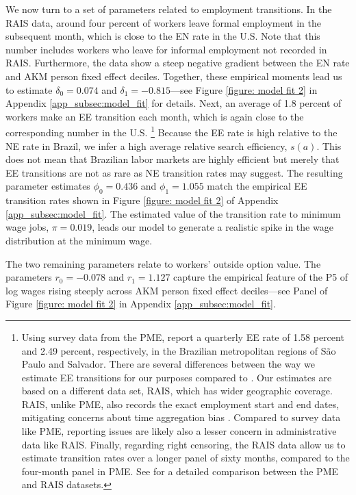 We now turn to a set of parameters related to employment transitions. In the RAIS data, around four percent of workers leave formal employment in the subsequent month, which is close to the EN rate in the U.S. Note that this number includes workers who leave for informal employment not recorded in RAIS. Furthermore, the data show a steep negative gradient between the EN rate and AKM person fixed effect deciles. Together, these empirical moments lead us to estimate $\delta_{0} = 0.074$ and $\delta_{1} = -0.815$---see Figure \ref{figure: model fit 2} in Appendix \ref{app_subsec:model_fit} for details. Next, an average of 1.8 percent of workers make an EE transition each month, which is again close to the corresponding number in the U.S.%
%
\footnote{Using survey data from the PME, \citet{MeghirNarita2015} report a quarterly EE rate of 1.58 percent and 2.49 percent, respectively, in the Brazilian metropolitan regions of S{\~{a}}o Paulo and Salvador. There are several differences between the way we estimate EE transitions for our purposes compared to \citet{MeghirNarita2015}. Our estimates are based on a different data set, RAIS, which has wider geographic coverage. RAIS, unlike PME, also records the exact employment start and end dates, mitigating concerns about time aggregation bias \citep{Shimer2012}. Compared to survey data like PME, reporting issues are likely also a lesser concern in administrative data like RAIS. Finally, regarding right censoring, the RAIS data allow us to estimate transition rates over a longer panel of sixty months, compared to the four-month panel in PME. See \citet{EngbomGonzagaMoserOlivieri2021} for a detailed comparison between the PME and RAIS datasets.} %
%
Because the EE rate is high relative to the NE rate in Brazil, we infer a high average relative search efficiency, $s(a)$. This does not mean that Brazilian labor markets are highly efficient but merely that EE transitions are not as rare as NE transition rates may suggest.%
%
The resulting parameter estimates $\phi_0=0.436$ and $\phi_1=1.055$ match the empirical EE transition rates shown in Figure \ref{figure: model fit 2} of Appendix \ref{app_subsec:model_fit}. The estimated value of the transition rate to minimum wage jobs, $\pi=0.019$, leads our model to generate a realistic spike in the wage distribution at the minimum wage.

The two remaining parameters relate to workers' outside option value. The parameters $r_0 = -0.078$ and $r_1 = 1.127$ capture the empirical feature of the P5 of log wages rising steeply across AKM person fixed effect deciles---see Panel  of Figure \ref{figure: model fit 2} in Appendix \ref{app_subsec:model_fit}.


